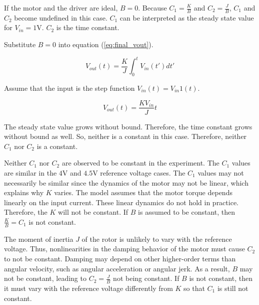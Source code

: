 If the motor and the driver are ideal, $B = 0$.
Because $C_1 = \frac{K}{B}$ and $C_2 = \frac{J}{B}$, $C_1$ and $C_2$ become undefined in this case.
$C_1$ can be interpreted as the steady state value for $V_{in} = 1$\si{\volt}.
$C_2$ is the time constant.

Substitute $B = 0$ into equation (\ref{eq:final_vout}).

\begin{equation}
	\label{eq:ideal_vout}
	V_{out}(t) = \frac{K}{J} \int_{0}^{t} V_{in}(t')dt'
\end{equation}

Assume that the input is the step function $V_{in}(t) = V_{in}1(t)$.

\begin{equation}
	\label{eq:ideal_vout_step}
	V_{out}(t) = \frac{K V_{in}}{J} t
\end{equation}

The steady state value grows without bound.
Therefore, the time constant grows without bound as well.
So, neither is a constant in this case.
Therefore, neither $C_1$ nor $C_2$ is a constant.

Neither $C_1$ nor $C_2$ are observed to be constant in the experiment.
The $C_1$ values are similar in the $4$\si{\volt} and $4.5$\si{\volt} reference voltage cases.
The $C_1$ values may not necessarily be similar since the dynamics of the motor may not be linear, which explains why $K$ varies.
The model assumes that the motor torque depends linearly on the input current.
These linear dynamics do not hold in practice.
Therefore, the $K$ will not be constant.
If $B$ is assumed to be constant, then $\frac{K}{B} = C_1$ is not constant.

The moment of inertia $J$ of the rotor is unlikely to vary with the reference voltage.
Thus, nonlinearities in the damping behavior of the motor must cause $C_2$ to not be constant.
Damping may depend on other higher-order terms than angular velocity, such as angular acceleration or angular jerk.
As a result, $B$ may not be constant, leading to $C_2 = \frac{J}{B}$ not being constant.
If $B$ is not constant, then it must vary with the reference voltage differently from $K$ so that $C_1$ is still not constant.
